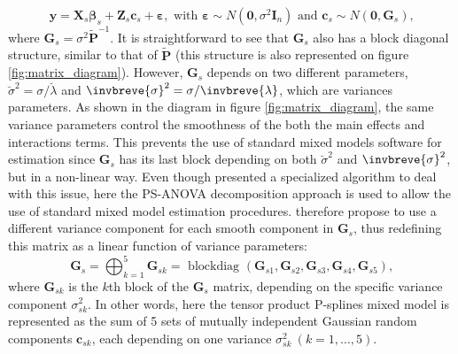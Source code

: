\begin{equation}
    \boldsymbol{y}=\boldsymbol{X}_{s} \boldsymbol{\beta}_{s}+\boldsymbol{Z}_{s} \boldsymbol{c}_{s}+\boldsymbol{\varepsilon}, 	
    \text { with } 
    \boldsymbol{\varepsilon} \sim N\left(\mathbf{0}, \sigma^{2} \boldsymbol{I}_{n}\right) 
    \text { and } 
    \boldsymbol{c}_{s} \sim N\left(\mathbf{0}, \boldsymbol{G}_{s}\right)
    \text{,}
\label{eq:smooth_surface_PS_ANOVA_rewritten}
\end{equation}
where $\boldsymbol{G}_{s} = \sigma^2\widetilde{\boldsymbol{P}}^{-1}$. It is straightforward to see that $\boldsymbol{G}_{s}$ 
also has a block diagonal structure, similar to that of $\widetilde{\boldsymbol{P}}$ (this structure is also represented on 
figure \ref{fig:matrix_diagram}). 
However, $\boldsymbol{G}_{s}$ depends on two different parameters, $\breve{\sigma}^2 =\sigma / \breve{\lambda}$ and $
\invbreve{\sigma}^2 =\sigma / \invbreve{\lambda}$, which are variances parameters. 
As shown in the diagram in figure \ref{fig:matrix_diagram}, the same variance parameters control the smoothness of the both the 
main effects and interactions terms. 
This prevents the use of standard mixed models software for estimation since $\mathbf{G}_s$ has its last block depending on both 
$\breve{\sigma}^2$ and $\invbreve{\sigma}^2$, but in a non-linear way. 
Even though \textcite{rodriguez-alvarez_fast_2015} presented a specialized algorithm to deal with this issue, 
here the PS-ANOVA decomposition approach \parencite{lee_efficient_2013} is used to allow the use of standard mixed model estimation procedures.\textcite{lee_efficient_2013} therefore propose to use a different variance component for each smooth component in $\mathbf{G}_s$, thus redefining this matrix as a linear function of variance parameters:
\begin{equation}
    \boldsymbol{G}_{s} = 
    \bigoplus_{k=1}^{5} \boldsymbol{G}_{s k}= 
    \text{ blockdiag }
    \left(\boldsymbol{G}_{s 1}, \boldsymbol{G}_{s 2}, \boldsymbol{G}_{s 3}, \boldsymbol{G}_{s 4}, \boldsymbol{G}_{s 5}\right)
    \text{,}
\end{equation}
where $\boldsymbol{G}_{s k}$ %
is the $k$th block of the $\mathbf{G}_{s}$ matrix, depending on the specific variance component $\sigma_{sk}^2$. 
In other words, here the tensor product P-splines mixed model is represented as the sum of 5 sets of mutually independent Gaussian random components $\mathbf{c}_{sk}$, each depending on one variance $\sigma_{sk}^2 \ (k=1,\ldots,5)$.\\
